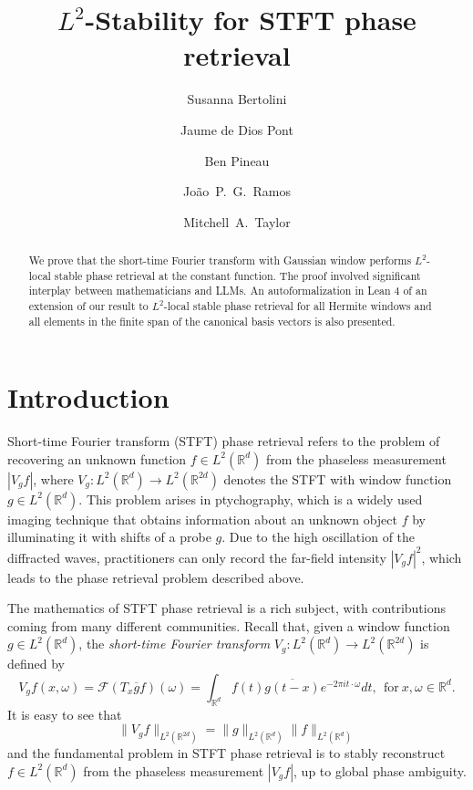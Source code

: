 \documentclass[11pt]{amsart}
\title{$L^2$-Stability for STFT phase retrieval}
\author[S.~Bertolini]{Susanna Bertolini}
\author[J.~de Dios Pont]{Jaume de Dios Pont}
\author[B.~Pineau]{Ben Pineau}
\author[J.~Ramos]{Jo\~ao~P.~G.\ Ramos}
\author[M.~Taylor]{Mitchell~A.\ Taylor}
\theoremstyle{remark}
\begin{document}
\begin{abstract}
We prove that the short-time Fourier transform with Gaussian window performs $L^2$-local stable phase retrieval at the constant function. The proof involved significant interplay between mathematicians and LLMs. An autoformalization in Lean 4 of an extension of our result to $L^2$-local stable phase retrieval for all Hermite windows and all elements in the finite span of the canonical basis vectors is also presented.
\end{abstract}

\maketitle

\section{Introduction}
Short-time Fourier transform (STFT) phase retrieval refers to the problem of recovering an unknown function $f\in L^2(\mathbb{R}^d)$ from the phaseless measurement $|V_gf|$, where $V_g:L^2(\mathbb{R}^d)\to L^2(\mathbb{R}^{2d})$ denotes the STFT with window function $g\in L^2(\mathbb{R}^d)$. This problem arises in ptychography, which is a widely used imaging technique that obtains information about an unknown object $f$ by illuminating it with shifts of a probe $g$. 
Due to the high oscillation of the diffracted waves, practitioners can only record the far-field intensity $|V_gf|^2$, which leads to the phase retrieval problem described above.
\medskip

The mathematics of STFT phase retrieval is a rich subject, with contributions coming from many different communities. Recall that, given a window function $g\in L^2(\mathbb{R}^d)$, the \emph{short-time Fourier transform} $V_g:L^2(\mathbb{R}^d)\to L^2(\mathbb{R}^{2d})$ is defined by
\begin{equation*}\label{STFT Def}
V_g f(x,\omega)=\mathcal{F}(T_x\overline{g}f) (\omega)=\int_{\mathbb{R}^d} f(t)\overline{g(t-x)}e^{-2\pi it\cdot \omega}dt, \ \ \text{for}\ x,\omega\in \mathbb{R}^d.
\end{equation*}
It is easy to see that 
\begin{equation}\label{isometry}
    \|V_g f\|_{L^2(\mathbb{R}^{2d})}=\|g\|_{L^2(\mathbb{R}^{d})} \|f\|_{L^2(\mathbb{R}^{d})}
\end{equation} and the fundamental problem in STFT phase retrieval is to stably reconstruct $f\in L^2(\mathbb{R}^d)$ from the phaseless measurement $|V_g f|$, up to global phase ambiguity. \medskip
\end{document}
